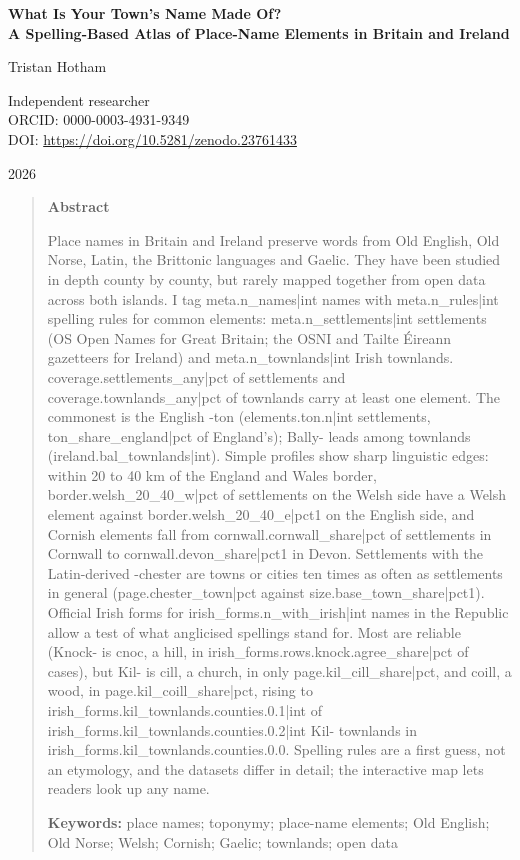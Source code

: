 \documentclass[11pt,a4paper]{article}
\begin{document}
\begin{center}
{\Large\bfseries What Is Your Town's Name Made Of?\\[2pt] A Spelling-Based Atlas of Place-Name Elements in Britain and Ireland\par}
\vspace{1.2em}
{\large Tristan Hotham\par}
\vspace{0.3em}
{\small Independent researcher\\
ORCID: 0000-0003-4931-9349\\
DOI: \href{https://doi.org/10.5281/zenodo.23761433}{https://doi.org/10.5281/zenodo.23761433}\par}
\vspace{0.8em}
2026
\end{center}

\begin{quote}
\small
\begin{center}\textbf{Abstract}\end{center}
Place names in Britain and Ireland preserve words from Old English, Old Norse, Latin, the Brittonic languages and Gaelic. They have been studied in depth county by county, but rarely mapped together from open data across both islands. I tag {{meta.n_names|int}} names with {{meta.n_rules|int}} spelling rules for common elements: {{meta.n_settlements|int}} settlements (OS Open Names for Great Britain; the OSNI and Tailte Éireann gazetteers for Ireland) and {{meta.n_townlands|int}} Irish townlands. {{coverage.settlements_any|pct}} of settlements and {{coverage.townlands_any|pct}} of townlands carry at least one element. The commonest is the English -ton ({{elements.ton.n|int}} settlements, {{ton_share_england|pct}} of England's); Bally- leads among townlands ({{ireland.bal_townlands|int}}). Simple profiles show sharp linguistic edges: within 20 to 40 km of the England and Wales border, {{border.welsh_20_40_w|pct}} of settlements on the Welsh side have a Welsh element against {{border.welsh_20_40_e|pct1}} on the English side, and Cornish elements fall from {{cornwall.cornwall_share|pct}} of settlements in Cornwall to {{cornwall.devon_share|pct1}} in Devon. Settlements with the Latin-derived -chester are towns or cities ten times as often as settlements in general ({{page.chester_town|pct}} against {{size.base_town_share|pct1}}). Official Irish forms for {{irish_forms.n_with_irish|int}} names in the Republic allow a test of what anglicised spellings stand for. Most are reliable (Knock- is cnoc, a hill, in {{irish_forms.rows.knock.agree_share|pct}} of cases), but Kil- is cill, a church, in only {{page.kil_cill_share|pct}}, and coill, a wood, in {{page.kil_coill_share|pct}}, rising to {{irish_forms.kil_townlands.counties.0.1|int}} of {{irish_forms.kil_townlands.counties.0.2|int}} Kil- townlands in {{irish_forms.kil_townlands.counties.0.0}}. Spelling rules are a first guess, not an etymology, and the datasets differ in detail; the interactive map lets readers look up any name.

\textbf{Keywords:} place names; toponymy; place-name elements; Old English; Old Norse; Welsh; Cornish; Gaelic; townlands; open data
\end{quote}
\end{document}
